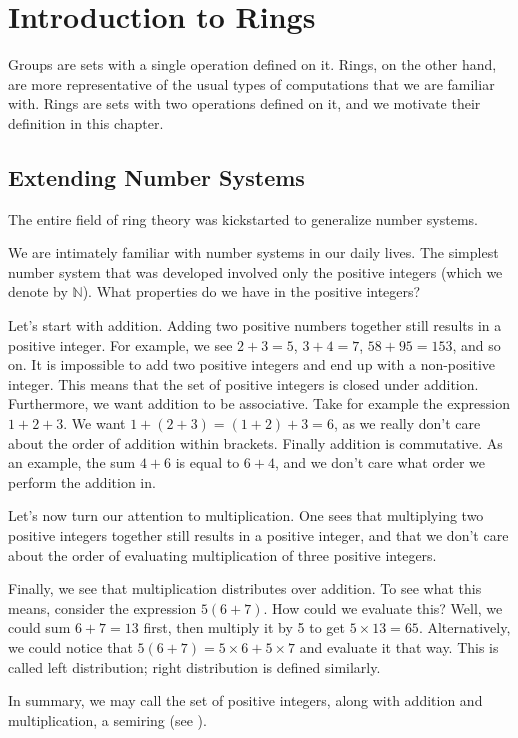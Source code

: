 \chapter{Introduction to Rings}
Groups are sets with a single operation defined on it. Rings, on the other hand, are more representative of the usual types of computations that we are familiar with. Rings are sets with two operations defined on it, and we motivate their definition in this chapter.

\section{Extending Number Systems}
The entire field of ring theory was kickstarted to generalize number systems.

We are intimately familiar with number systems in our daily lives. The simplest number system that was developed involved only the positive integers (which we denote by $\mathbb{N}$). What properties do we have in the positive integers?

Let's start with addition. Adding two positive numbers together still results in a positive integer. For example, we see $2 + 3 = 5$, $3 + 4 = 7$, $58 + 95 = 153$, and so on. It is impossible to add two positive integers and end up with a non-positive integer. This means that the set of positive integers is closed under addition. Furthermore, we want addition to be associative. Take for example the expression $1 + 2 + 3$. We want $1 + (2 + 3) = (1 + 2) + 3 = 6$, as we really don't care about the order of addition within brackets. Finally addition is commutative. As an example, the sum $4 + 6$ is equal to $6 + 4$, and we don't care what order we perform the addition in.

Let's now turn our attention to multiplication. One sees that multiplying two positive integers together still results in a positive integer, and that we don't care about the order of evaluating multiplication of three positive integers.

Finally, we see that multiplication distributes over addition. To see what this means, consider the expression $5(6+7)$. How could we evaluate this? Well, we could sum $6+7 = 13$ first, then multiply it by 5 to get $5\times13 = 65$. Alternatively, we could notice that $5(6+7) = 5 \times 6 + 5 \times 7$ and evaluate it that way. This is called left distribution; right distribution is defined similarly.

In summary, we may call the set of positive integers, along with addition and multiplication, a semiring (see \cite{mathworld_semiring-definition}).

